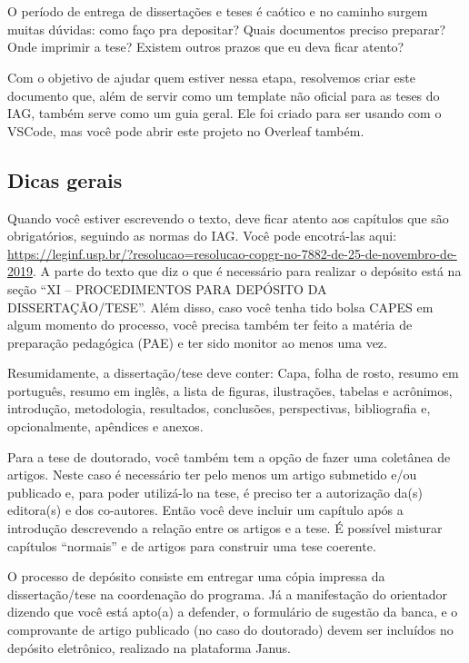 \setcounter{page}{0}
\chapter{\chapternameintro}

  O período de entrega de dissertações e teses é caótico e no caminho surgem muitas dúvidas: como faço pra depositar? Quais documentos preciso preparar? Onde imprimir a tese? Existem outros prazos que eu deva ficar atento?

  Com o objetivo de ajudar quem estiver nessa etapa, resolvemos criar este documento que, além de servir como um template não oficial para as teses do IAG, também serve como um guia geral. Ele foi criado para ser usando com o VSCode, mas você pode abrir este projeto no Overleaf também.

  \section{Dicas gerais}

    Quando você estiver escrevendo o texto, deve ficar atento aos capítulos que são obrigatórios, seguindo as normas do IAG. Você pode encotrá-las aqui: \url{https://leginf.usp.br/?resolucao=resolucao-copgr-no-7882-de-25-de-novembro-de-2019}. A parte do texto que diz o que é necessário para realizar o depósito está na seção ``XI – PROCEDIMENTOS PARA DEPÓSITO DA DISSERTAÇÃO/TESE''. Além disso, caso você tenha tido bolsa CAPES em algum momento do processo, você precisa também ter feito a matéria de preparação pedagógica (PAE) e ter sido monitor ao menos uma vez.

    Resumidamente, a dissertação/tese deve conter: Capa, folha de rosto, resumo em português, resumo em inglês, a lista de figuras, ilustrações, tabelas e acrônimos, introdução, metodologia, resultados, conclusões, perspectivas, bibliografia e, opcionalmente, apêndices e anexos.

    Para a tese de doutorado, você também tem a opção de fazer uma coletânea de artigos. Neste caso é necessário ter pelo menos um artigo submetido e/ou publicado e, para poder utilizá-lo na tese, é preciso ter a autorização da(s) editora(s) e dos co-autores. Então você deve incluir um capítulo após a introdução descrevendo a relação entre os artigos e a tese. É possível misturar capítulos ``normais'' e de artigos para construir uma tese coerente.

    O processo de depósito consiste em entregar uma cópia impressa da dissertação/tese na coordenação do programa. Já a manifestação do orientador dizendo que você está apto(a) a defender, o formulário de sugestão da banca, e o comprovante de artigo publicado (no caso do doutorado) devem ser incluídos no depósito eletrônico, realizado na plataforma Janus.

